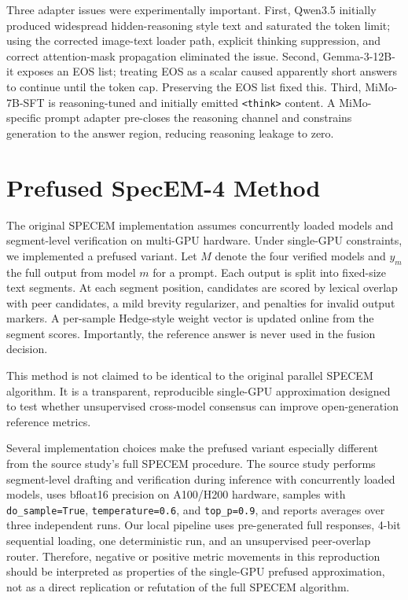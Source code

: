 \documentclass[11pt]{article}
\begin{document}
Three adapter issues were experimentally important. First, Qwen3.5 initially produced widespread hidden-reasoning style text and saturated the token limit; using the corrected image-text loader path, explicit thinking suppression, and correct attention-mask propagation eliminated the issue. Second, Gemma-3-12B-it exposes an EOS list; treating EOS as a scalar caused apparently short answers to continue until the token cap. Preserving the EOS list fixed this. Third, MiMo-7B-SFT is reasoning-tuned and initially emitted \texttt{<think>} content. A MiMo-specific prompt adapter pre-closes the reasoning channel and constrains generation to the answer region, reducing reasoning leakage to zero.

\section{Prefused SpecEM-4 Method}
The original SPECEM implementation assumes concurrently loaded models and segment-level verification on multi-GPU hardware. Under single-GPU constraints, we implemented a prefused variant. Let $M$ denote the four verified models and $y_m$ the full output from model $m$ for a prompt. Each output is split into fixed-size text segments. At each segment position, candidates are scored by lexical overlap with peer candidates, a mild brevity regularizer, and penalties for invalid output markers. A per-sample Hedge-style weight vector is updated online from the segment scores. Importantly, the reference answer is never used in the fusion decision.

This method is not claimed to be identical to the original parallel SPECEM algorithm. It is a transparent, reproducible single-GPU approximation designed to test whether unsupervised cross-model consensus can improve open-generation reference metrics.

Several implementation choices make the prefused variant especially different from the source study's full SPECEM procedure. The source study performs segment-level drafting and verification during inference with concurrently loaded models, uses bfloat16 precision on A100/H200 hardware, samples with \texttt{do\_sample=True}, \texttt{temperature=0.6}, and \texttt{top\_p=0.9}, and reports averages over three independent runs. Our local pipeline uses pre-generated full responses, 4-bit sequential loading, one deterministic run, and an unsupervised peer-overlap router. Therefore, negative or positive metric movements in this reproduction should be interpreted as properties of the single-GPU prefused approximation, not as a direct replication or refutation of the full SPECEM algorithm.
\end{document}
